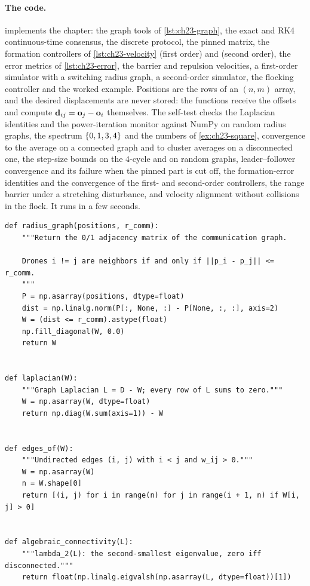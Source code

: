 \paragraph{The code.}
 implements the chapter: the graph tools of
\cref{lst:ch23-graph}, the exact and RK4 continuous-time consensus, the
discrete protocol, the pinned matrix, the formation controllers of
\cref{lst:ch23-velocity} (first order) and 
(second order), the error metrics of \cref{lst:ch23-error}, the barrier and
repulsion velocities, a first-order simulator with a switching radius graph,
a second-order simulator, the flocking controller and the worked example.
Positions are the rows of an $(n, m)$ array, and the desired displacements are
never stored: the functions receive the offsets and compute
$\mathbf{d}_{ij} = \mathbf{o}_j - \mathbf{o}_i$ themselves. The self-test checks the
Laplacian identities and the power-iteration monitor against NumPy on random
radius graphs, the spectrum $\left\{ 0, 1, 3, 4 \right\}$ and the numbers of
\cref{ex:ch23-square}, convergence to the average on a connected graph and to
cluster averages on a disconnected one, the step-size bounds on the $4$-cycle
and on random graphs, leader--follower convergence and its failure when the
pinned part is cut off, the formation-error identities and the convergence of
the first- and second-order controllers, the range barrier under a stretching
disturbance, and velocity alignment without collisions in the flock. It runs in
a few seconds.

\begin{lstlisting}[caption={The communication graph from positions and a radius, its Laplacian, its edge list and $\lambda_2$ (from \code{code/ch23\_consensus.py}).},label={lst:ch23-graph}]
def radius_graph(positions, r_comm):
    """Return the 0/1 adjacency matrix of the communication graph.

    Drones i != j are neighbors if and only if ||p_i - p_j|| <= r_comm.
    """
    P = np.asarray(positions, dtype=float)
    dist = np.linalg.norm(P[:, None, :] - P[None, :, :], axis=2)
    W = (dist <= r_comm).astype(float)
    np.fill_diagonal(W, 0.0)
    return W


def laplacian(W):
    """Graph Laplacian L = D - W; every row of L sums to zero."""
    W = np.asarray(W, dtype=float)
    return np.diag(W.sum(axis=1)) - W


def edges_of(W):
    """Undirected edges (i, j) with i < j and w_ij > 0."""
    W = np.asarray(W)
    n = W.shape[0]
    return [(i, j) for i in range(n) for j in range(i + 1, n) if W[i, j] > 0]


def algebraic_connectivity(L):
    """lambda_2(L): the second-smallest eigenvalue, zero iff disconnected."""
    return float(np.linalg.eigvalsh(np.asarray(L, dtype=float))[1])
\end{lstlisting}

